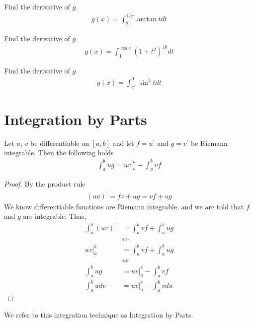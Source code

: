 \begin{exercise}
Find the derivative of $g$.
\begin{align*}
    g(x) = \int_{2}^{1/x} \arctan t dt
\end{align*}
\end{exercise}

\begin{exercise}
Find the derivative of $g$.
\begin{align*}
    g(x) = \int_{1}^{\cos x} (1 + t^{2})^{10} dt
\end{align*}
\end{exercise}

\begin{exercise}
Find the derivative of $g$.
\begin{align*}
    g(x) = \int_{e^{x}}^{0} \sin^{3} t dt
\end{align*}
\end{exercise}

\newpage
\section{Integration by Parts}

\begin{theorem}
Let $u$, $v$ be differentiable on $[a, b]$ and let $f = u^{'}$ and $g = v^{'}$ be Riemann integrable. Then the following holds
\begin{align*}
    \int_{a}^{b} ug = uv \Big|_{a}^{b} - \int_{a}^{b} vf
\end{align*}
\begin{proof}
By the product rule
\begin{align*}
    (uv)^{'} = fv + ug = vf + ug
\end{align*}
We know differentiable functions are Riemann integrable, and we are told that $f$ and $g$ are integrable. Thus,
\begin{align*}
    \int_{a}^{b} (uv)^{'} &= \int_{a}^{b} vf + \int_{a}^{b} ug\\[2ex]
    &\Longleftrightarrow\\[2ex]
    uv \Big|_{a}^{b} &= \int_{a}^{b} vf + \int_{a}^{b} ug\\[2ex] 
    &\Longleftrightarrow\\[2ex]
    \int_{a}^{b} ug &= uv \Big|_{a}^{b} - \int_{a}^{b} vf\\[2ex]
    \int_{a}^{b} u dv &= uv \Big|_{a}^{b} - \int_{a}^{b} v du
\end{align*}
\end{proof}
We refer to this integration technique as Integration by Parts.
\end{theorem}

